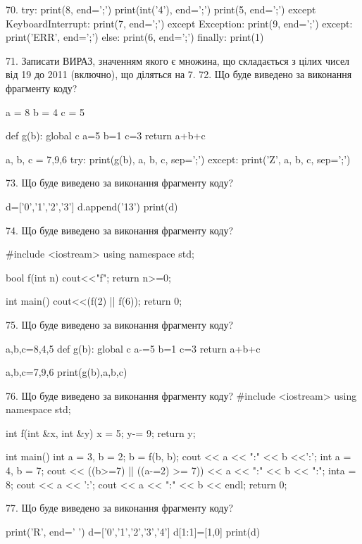 \documentclass[11pt]{article}
\begin{document}
{%
70. 
try:
    print(8, end=';')
    print(int('4'), end=';')
    print(5, end=';')
except KeyboardInterrupt:
    print(7, end=';')
except Exception:
    print(9, end=';')
except:
    print('ERR', end=';')
else:
    print(6, end=';')
finally:
    print(1)

71. 
Записати ВИРАЗ, значенням якого є множина, що складається з цілих чисел від 19 до 2011 (включно), що діляться на 7.
72. Що буде виведено за виконання фрагменту коду?

a = 8
b = 4
c = 5

def g(b):
global c    a=5
    b=1
    c=3
    return a+b+c

a, b, c = 7,9,6
try:
    print(g(b), a, b, c, sep=';')
except:
    print('Z', a, b, c, sep=';')

73. Що буде виведено за виконання фрагменту коду?

d=['0','1','2','3']
d.append('13')
print(d)


74. Що буде виведено за виконання фрагменту коду?

#include <iostream>
using namespace std;

bool f(int n){
    cout<<"f";
    return n>=0;
}

int main(){
    cout<<(f(2) || f(6));
    return 0;
}

75. Що буде виведено за виконання фрагменту коду?

a,b,c=8,4,5
def g(b):
global c    a-=5
    b=1
    c=3
    return a+b+c

a,b,c=7,9,6
print(g(b),a,b,c)

76. Що буде виведено за виконання фрагменту коду?
#include <iostream>
using namespace std;

int f(int &x, int &y){
    x = 5;
    y-= 9;
    return y;
}

int main(){
    int a = 3, b = 2;
    b = f(b, b);
    cout << a << ":" << b <<':';
    {
        int a = 4, b = 7;
        cout << ((b>=7) || ((a-=2) >= 7))
             << a << ":" << b << ":";
    }
    {
        inta = 8;
        cout << a << ':';
    }
    cout << a << ":" << b << endl;
    return 0;
}


77. Що буде виведено за виконання фрагменту коду?

print('R', end=' ')
d=['0','1','2','3','4']
d[1:1]=[1,0]
print(d)


}
\end{document}
